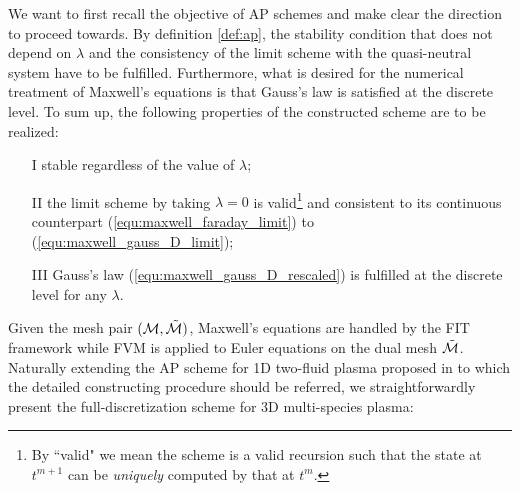 \documentclass{report}
\begin{document}
We want to first recall the objective of AP schemes and make clear the direction to proceed towards. By definition \ref{def:ap}, the stability condition that does not depend on $\lambda$ and the consistency of the limit scheme with the quasi-neutral system have to be fulfilled. Furthermore, what is desired for the numerical treatment of Maxwell's equations is that Gauss's law is satisfied at the discrete level. To sum up, the following properties of the constructed scheme are to be realized:

\begin{itemize}
    \item[I] stable regardless of the value of $\lambda$;
    \item[II] the limit scheme by taking $\lambda = 0$ is valid\footnote{By ``valid" we mean the scheme is a valid recursion such that the state at $t^{m+1}$ can be \emph{uniquely} computed by that at $t^m$.} and consistent to its continuous counterpart (\ref{equ:maxwell_faraday_limit}) to (\ref{equ:maxwell_gauss_D_limit});
    \item[III] Gauss's law (\ref{equ:maxwell_gauss_D_rescaled}) is fulfilled at the discrete level for any $\lambda$. \label{condition3}
\end{itemize}

Given the mesh pair $(\mathcal{M}, \Tilde{\mathcal{M}})$, Maxwell's equations are handled by the FIT framework while FVM is applied to Euler equations on the dual mesh 
$\Tilde{\mathcal{M}}$. Naturally extending the AP scheme for 1D two-fluid plasma proposed in \cite{degond_2012} to which the detailed constructing procedure should be referred, we straightforwardly present the full-discretization scheme for 3D multi-species plasma:
\end{document}
